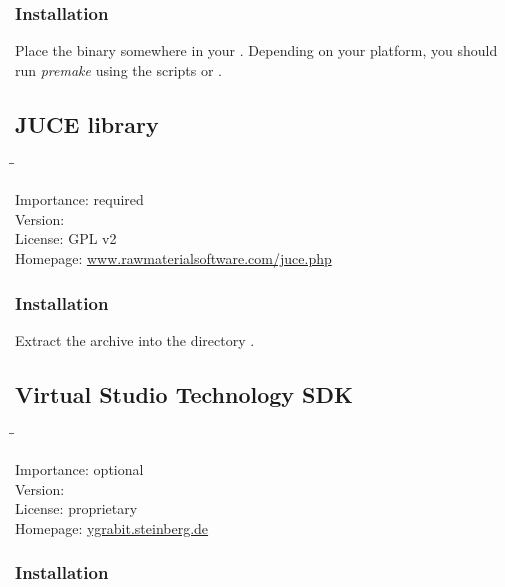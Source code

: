 \subsubsection{Installation}

Place the binary somewhere in your .  Depending on your
platform, you should run \emph{premake} using the scripts
 or .

\newpage %

\subsection{JUCE library}

\begin{tabbing}
  \hspace*{6em}\=\=\kill

  Importance:  \> required \\
  Version:      \\
  License:     \> GPL v2 \\
  Homepage:    \> \href{http://www.rawmaterialsoftware.com/juce.php}{www.rawmaterialsoftware.com/juce.php}
\end{tabbing}

\subsubsection{Installation}

Extract the archive into the directory .

\subsection{Virtual Studio Technology SDK}

\begin{tabbing}
  \hspace*{6em}\=\=\kill

  Importance:  \> optional \\
  Version:      \\
  License:     \> proprietary \\
  Homepage:    \> \href{http://ygrabit.steinberg.de/}{ygrabit.steinberg.de}
\end{tabbing}

\subsubsection{Installation}

